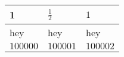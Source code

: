 \documentclass[12pt]{article}
\begin{document}
\begin{table}[]
\begin{tabular}{|l|l|l|}
\hline 
1 & $\frac 1 2$ & $1$\\ \hline 
hey & hey & hey\\ \hline 
$100000$ & $100001$ & $100002$\\ \hline 
\end{tabular}
\end{table}
\end{document}
